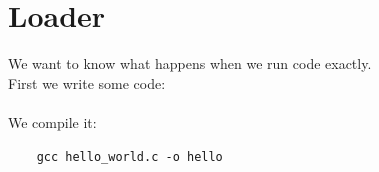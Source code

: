\documentclass[10pt]{beamer}
\begin{document}
\section*{Loader}
\frame{\sectionpage}
\begin{frame}{}
    We want to know what happens when we run code exactly. \\
    First we write some code: \vspace{0.35cm} \\ 
     \vspace{0.35cm} \\	
    We compile it:  \\ 
    \begin{verbatim}
    gcc hello_world.c -o hello
    \end{verbatim}
    \framebreak
    

\end{frame}
\end{document}

